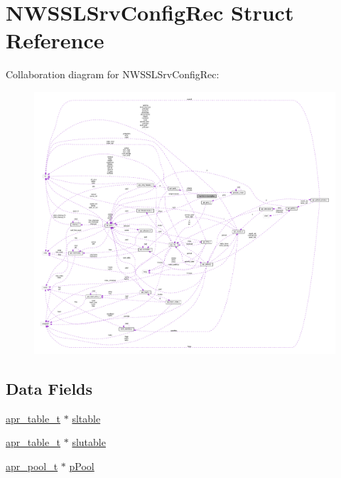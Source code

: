 \hypertarget{structNWSSLSrvConfigRec}{}\section{N\+W\+S\+S\+L\+Srv\+Config\+Rec Struct Reference}
\label{structNWSSLSrvConfigRec}


Collaboration diagram for N\+W\+S\+S\+L\+Srv\+Config\+Rec\+:
\nopagebreak
\begin{figure}[H]
\begin{center}
\leavevmode
\includegraphics[width=350pt]{structNWSSLSrvConfigRec__coll__graph}
\end{center}
\end{figure}
\subsection*{Data Fields}
\begin{DoxyCompactItemize}
\item 
\hyperlink{structapr__table__t}{apr\+\_\+table\+\_\+t} $\ast$ \hyperlink{structNWSSLSrvConfigRec_a47d3d656189deed5fa9aaaa480ebe7bc}{sltable}
\item 
\hyperlink{structapr__table__t}{apr\+\_\+table\+\_\+t} $\ast$ \hyperlink{structNWSSLSrvConfigRec_a3eb8c680ec7d6064292768215a7dc05b}{slutable}
\item 
\hyperlink{structapr__pool__t}{apr\+\_\+pool\+\_\+t} $\ast$ \hyperlink{structNWSSLSrvConfigRec_a8ba851377a1fa1d5e253e436e5413464}{p\+Pool}
\end{DoxyCompactItemize}


